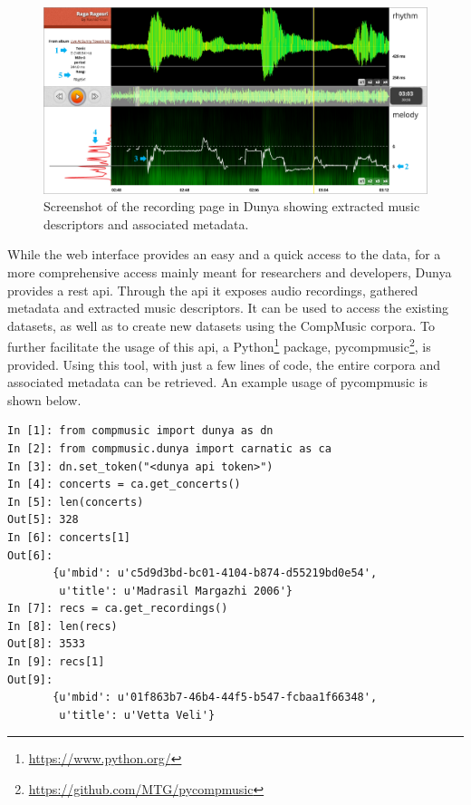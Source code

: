 \begin{figure}
	\begin{center}
		\includegraphics[width=\figSizeHundred]{ch08_applications/figures/dunyaScreenshot.pdf}
		\end{center}
		\caption[Screenshot of the recording page in Dunya]{Screenshot of the recording page in Dunya showing extracted music descriptors and associated metadata.}
		\label{fig:dunya_recording}
\end{figure}

While the web interface provides an easy and a quick access to the data, for a more comprehensive access mainly meant for researchers and developers, Dunya provides a \acrshort{rest} \acrshort{api}. Through the \acrshort{api} it exposes audio recordings, gathered metadata and extracted music descriptors. It can be used to access the existing datasets, as well as to create new datasets using the CompMusic corpora. To further facilitate the usage of this \acrshort{api}, a Python\footnote{\url{https://www.python.org/}} package, \gls{pycompmusic}\footnote{\url{https://github.com/MTG/pycompmusic}}, is provided. Using this tool, with just a few lines of code, the entire corpora and associated metadata can be retrieved. An example usage of \gls{pycompmusic} is shown below.

%
%
%
%
%
{
	\small
\begin{verbatim}
In [1]: from compmusic import dunya as dn
In [2]: from compmusic.dunya import carnatic as ca
In [3]: dn.set_token("<dunya api token>")
In [4]: concerts = ca.get_concerts()
In [5]: len(concerts)
Out[5]: 328
In [6]: concerts[1]
Out[6]: 
       {u'mbid': u'c5d9d3bd-bc01-4104-b874-d55219bd0e54',
        u'title': u'Madrasil Margazhi 2006'}
In [7]: recs = ca.get_recordings()
In [8]: len(recs)
Out[8]: 3533
In [9]: recs[1]
Out[9]: 
       {u'mbid': u'01f863b7-46b4-44f5-b547-fcbaa1f66348',
        u'title': u'Vetta Veli'}        
\end{verbatim}
}

